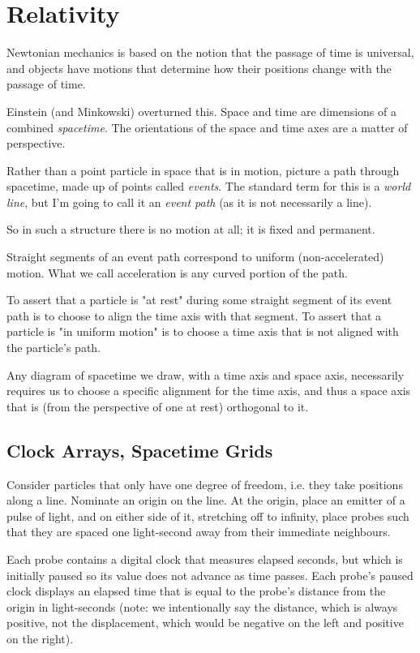 \chapter{Relativity} \label{ch:relativity}

Newtonian mechanics is based on the notion that the passage of time is universal, and objects have motions that determine how their positions change with the passage of time.

Einstein (and Minkowski) overturned this. Space and time are dimensions of a combined \textit{spacetime}. The orientations of the space and time axes are a matter of perspective.

Rather than a point particle in space that is in motion, picture a path through spacetime, made up of points called \textit{events}. The standard term for this is a \textit{world line}, but I'm going to call it an \textit{event path} (as it is not necessarily a line).

So in such a structure there is no motion at all; it is fixed and permanent.

Straight segments of an event path correspond to uniform (non-accelerated) motion. What we call acceleration is any curved portion of the path.

To assert that a particle is "at rest" during some straight segment of its event path is to choose to align the time axis with that segment. To assert that a particle is "in uniform motion" is to choose a time axis that is not aligned with the particle's path.

Any diagram of spacetime we draw, with a time axis and space axis, necessarily requires us to choose a specific alignment for the time axis, and thus a space axis that is (from the perspective of one at rest) orthogonal to it.

\section{Clock Arrays, Spacetime Grids}

Consider particles that only have one degree of freedom, i.e. they take positions along a line. Nominate an origin on the line. At the origin, place an emitter of a pulse of light, and on either side of it, stretching off to infinity, place probes such that they are spaced one light-second away from their immediate neighbours.

Each probe contains a digital clock that measures elapsed seconds, but which is initially paused so its value does not advance as time passes. Each probe's paused clock displays an elapsed time that is equal to the probe's distance from the origin in light-seconds (note: we intentionally say the distance, which is always positive, not the displacement, which would be negative on the left and positive on the right).

